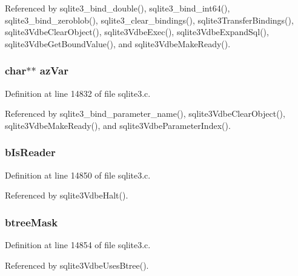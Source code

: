 Referenced by sqlite3\+\_\+bind\+\_\+double(), sqlite3\+\_\+bind\+\_\+int64(), sqlite3\+\_\+bind\+\_\+zeroblob(), sqlite3\+\_\+clear\+\_\+bindings(), sqlite3\+Transfer\+Bindings(), sqlite3\+Vdbe\+Clear\+Object(), sqlite3\+Vdbe\+Exec(), sqlite3\+Vdbe\+Expand\+Sql(), sqlite3\+Vdbe\+Get\+Bound\+Value(), and sqlite3\+Vdbe\+Make\+Ready().

\hypertarget{struct_vdbe_a61698685ffc73e64afd9ed436a5a101a}{}
\subsubsection[{az\+Var}]{\setlength{\rightskip}{0pt plus 5cm}char$\ast$$\ast$ az\+Var}\label{struct_vdbe_a61698685ffc73e64afd9ed436a5a101a}


Definition at line 14832 of file sqlite3.\+c.



Referenced by sqlite3\+\_\+bind\+\_\+parameter\+\_\+name(), sqlite3\+Vdbe\+Clear\+Object(), sqlite3\+Vdbe\+Make\+Ready(), and sqlite3\+Vdbe\+Parameter\+Index().

\hypertarget{struct_vdbe_a3f128124b41f626e42e76962fc727509}{}
\subsubsection[{b\+Is\+Reader}]{ b\+Is\+Reader}\label{struct_vdbe_a3f128124b41f626e42e76962fc727509}


Definition at line 14850 of file sqlite3.\+c.



Referenced by sqlite3\+Vdbe\+Halt().

\hypertarget{struct_vdbe_acc21071966acb6bde90bbf5bd3ee6474}{}
\subsubsection[{btree\+Mask}]{ btree\+Mask}\label{struct_vdbe_acc21071966acb6bde90bbf5bd3ee6474}


Definition at line 14854 of file sqlite3.\+c.



Referenced by sqlite3\+Vdbe\+Uses\+Btree().

